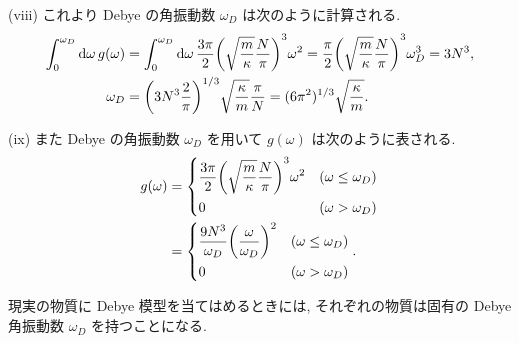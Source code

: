 \documentclass[uplatex,dvipdfmx,a4paper,11pt]{jlreq}
\theoremstyle{definition}
\begin{document}
(viii) これより Debye の角振動数 $\omega_D$ は次のように計算される.
\begin{align}
  \int_0^{\omega_D}\dd{\omega}g(\omega) & = \int_0^{\omega_D}\dd{\omega}\frac{3\pi}{2}\qty(\sqrt{\frac{m}{\kappa}}\frac{N}{\pi})^3\omega^2 = \frac{\pi}{2}\qty(\sqrt{\frac{m}{\kappa}}\frac{N}{\pi})^3\omega_D^3 = 3N^3, \\
  \omega_D                              & = \qty(3N^3\frac{2}{\pi})^{1/3}\sqrt{\frac{\kappa}{m}}\frac{\pi}{N} = (6\pi^2)^{1/3}\sqrt{\frac{\kappa}{m}}.
\end{align}

(ix) また Debye の角振動数 $\omega_D$ を用いて $g(\omega)$ は次のように表される.
\begin{align}
  g(\omega) & = \begin{dcases}
                  \frac{3\pi}{2}\qty(\sqrt{\frac{m}{\kappa}}\frac{N}{\pi})^3\omega^2 & (\omega\leq\omega_D) \\
                  0                                                                  & (\omega > \omega_D)
                \end{dcases} \\
            & = \begin{dcases}
                  \frac{9N^3}{\omega_D}\qty(\frac{\omega}{\omega_D})^2 & (\omega\leq\omega_D) \\
                  0                                                    & (\omega > \omega_D)
                \end{dcases}.
\end{align}

現実の物質に Debye 模型を当てはめるときには, それぞれの物質は固有の Debye 角振動数 $\omega_D$ を持つことになる.
\end{document}

